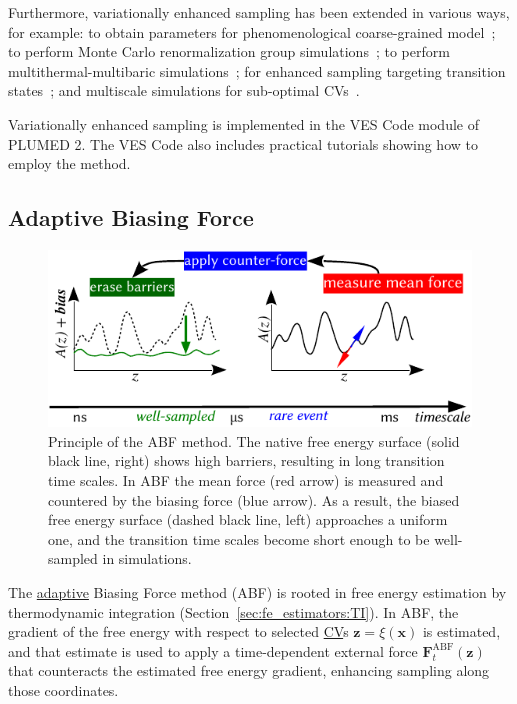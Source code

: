 \documentclass[9pt,review]{livecoms}
\newcommand{\vx}{\mathbf{x}}
\newcommand{\vz}{\mathbf{z}}
\newcommand{\vF}{\mathbf{F}}
\begin{document}
Furthermore, variationally enhanced sampling has been extended in various ways, for example:
to obtain parameters for phenomenological coarse-grained model~\cite{Invernizzi-PNAS-2017};
to perform Monte Carlo renormalization group simulations~\cite{Wu_VES-RGMC_PRL2017,Wu_VES-RGMC_PRE2019,Wu_VES-RGMC_PRL2020};
to perform multithermal-multibaric simulations~\cite{Piaggi_MultiVES_2019};
for enhanced sampling targeting transition states~\cite{Debnath_VES-TS_2019}; and
multiscale simulations for sub-optimal CVs~\cite{Invernizzi_VES_DelteF_2019}.

Variationally enhanced sampling is implemented in the VES Code module of PLUMED 2. The VES Code also includes practical tutorials showing how to employ the method.




\subsection{Adaptive Biasing Force}
\label{sec:ABF}

\begin{figure}
    \centering
    \includegraphics{Figures/abf_new.pdf}
    \caption{Principle of the ABF method. The native free energy surface (solid black line, right) shows high barriers, resulting in long transition time scales.
    In ABF the mean force (red arrow) is measured and countered by the biasing force (blue arrow). As a result, the biased free energy surface (dashed black line, left) approaches a uniform one, and the transition time scales become short enough to be well-sampled in simulations.}
    \label{fig:ABF}
\end{figure}

The \hyperlink{ref:Adaptive} {adaptive} Biasing Force method (ABF) is rooted in free energy estimation by thermodynamic integration (Section~\ref{sec:fe_estimators:TI}).
In ABF, the gradient of the free energy with respect to selected \hyperlink{ref:CV} {CV}s $\vz = \xi(\vx)$ is estimated, and that estimate is used to apply a time-dependent external force $\vF^\mathrm{ABF}_t(\vz)$ that counteracts the estimated free energy gradient, enhancing sampling along those coordinates.
\end{document}
